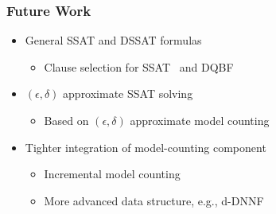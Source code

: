 \begin{frame}
      \frametitle{Future Work}
      \begin{itemize}
            \item General SSAT and DSSAT formulas
                  \pause
                  \begin{itemize}
                        \item Clause selection for SSAT~\cite{Chen2021} and DQBF~\cite{Tentrup2019}
                              \pause
                  \end{itemize}
            \item $(\epsilon,\delta)$ approximate SSAT solving
                  \pause
                  \begin{itemize}
                        \item Based on $(\epsilon,\delta)$ approximate model counting
                              \pause
                  \end{itemize}
            \item Tighter integration of model-counting component
                  \pause
                  \begin{itemize}
                        \item Incremental model counting
                              \pause
                        \item More advanced data structure, e.g., d-DNNF~\cite{Darwiche2002dDNNF}
                  \end{itemize}
      \end{itemize}
\end{frame}